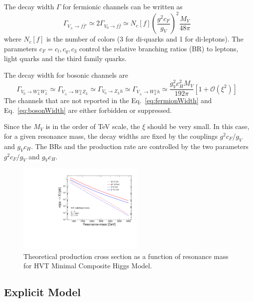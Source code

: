 The decay width $\Gamma$ for fermionic channels can be written as
\begin{equation} \label{eq:fermionWidth}
  \Gamma_{V_\pm\rightarrow f\bar{f}'} \simeq 2\Gamma_{V_0\rightarrow f\bar{f}} \simeq N_c[f](\frac{g^2c_F}{g_V})^2\frac{M_V}{48\pi}
\end{equation}
where $N_c[f]$ is the number of colors (3 for di-quarks and 1 for di-leptons). The parameters $c_F={c_l,c_q,c_3}$ control the relative branching ratios (BR) to leptons, light quarks and the third family quarks.

The decay width for bosonic channels are
\begin{equation} \label{eq:bosonWidth}
  \Gamma_{V_0\rightarrow W_L^+W_L^-}\simeq\Gamma_{V_\pm\rightarrow W_L^\pm Z_L}\simeq\Gamma_{V_0\rightarrow Z_Lh}\simeq\Gamma_{V_\pm\rightarrow W_L^\pm h}\simeq\frac{g_V^2c_H^2M_V}{192\pi}[1+\mathcal{O}(\xi^2)]
\end{equation}
The channels that are not reported in the Eq.~\ref{eq:fermionWidth} and Eq.~\ref{eq:bosonWidth} are either forbidden or suppressed.

Since the $M_V$ is in the order of TeV scale, the $\xi$ should be very small. In this case, for a given resonance mass, the decay widths are fixed by the couplings $g^2c_F/g_V$ and $g_Vc_H$. The BRs and the production rate are controlled by the two parameters $g^2c_F/g_V$ and $g_Vc_H$.

\begin{figure}[t]
  \centering
  \includegraphics[width=0.55\textwidth]{Figures/hvt-xsec.pdf}
  \caption{Theoretical production cross section as a function of resonance mass for HVT Minimal Composite Higgs Model.}
  \label{fig:hvt_xsec}
\end{figure}

\subsection{Explicit Model} \label{sec:modelb}

